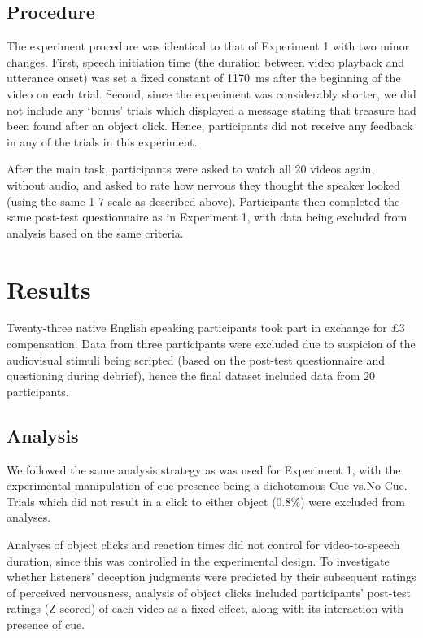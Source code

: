 \documentclass[a4paper,man,natbib]{apa6}
\begin{document}
\subsection{Procedure}
The experiment procedure was identical to that of Experiment 1 with two minor changes.
First, speech initiation time (the duration between video playback and utterance onset) was set a fixed constant of 1170~ms after the beginning of the video on each trial.
Second, since the experiment was considerably shorter, we did not include any `bonus' trials which displayed a message stating that treasure had been found after an object click.
Hence, participants did not receive any feedback in any of the trials in this experiment.

After the main task, participants were asked to watch all 20 videos again, without audio, and asked to rate how nervous they thought the speaker looked (using the same 1-7 scale as described above).
Participants then completed the same post-test questionnaire as in Experiment 1, with data being excluded from analysis based on the same criteria.

\section{Results}
Twenty-three native English speaking participants took part in exchange for \pounds{}3 compensation. 
Data from three participants were excluded due to suspicion of the audiovisual stimuli being scripted (based on the post-test questionnaire and questioning during debrief), hence the final dataset included data from 20 participants.

\subsection{Analysis}
We followed the same analysis strategy as was used for Experiment 1, with the experimental manipulation of cue presence being a dichotomous Cue vs.\@ No Cue.
Trials which did not result in a click to either object (0.8\%) were excluded from analyses.

Analyses of object clicks and reaction times did not control for video-to-speech duration, since this was controlled in the experimental design.
To investigate whether listeners' deception judgments were predicted by their subsequent ratings of perceived nervousness, analysis of object clicks included participants' post-test ratings (Z scored) of each video as a fixed effect, along with its interaction with presence of cue.
\end{document}
